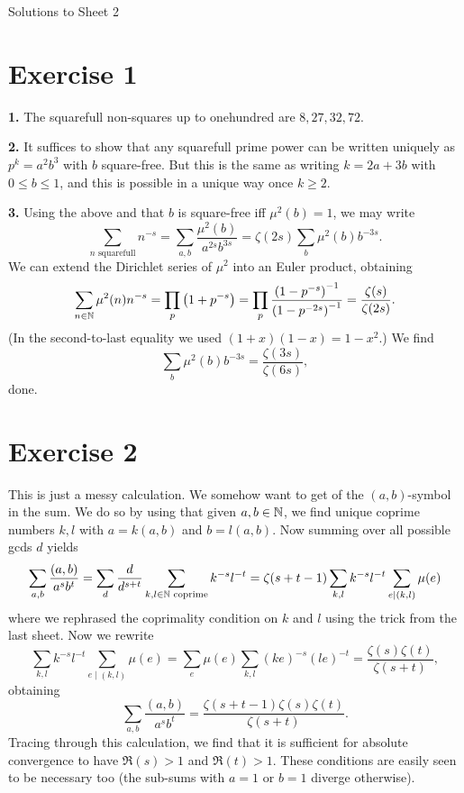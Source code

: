 \documentclass[a4paper,11pt]{article}
\begin{document}
\begin{center}
    \huge{Solutions to Sheet 2}
\end{center}

\section*{Exercise 1}
\textbf{1.} The squarefull non-squares up to onehundred are $8,27,32,72$.

\textbf{2.} It suffices to show that any squarefull prime power can be written uniquely as
$p^k = a^2 b^3$ with $b$ square-free. But this is the same as writing $k =
2a+3b$ with $0 \leq b \leq 1$, and this is possible in a unique way once $k \geq 2$. 

\textbf{3.} Using the above and that $b$ is square-free iff $\mu^2(b) = 1$, we may write
\[
    \sum_{n \text{ squarefull}} n^{-s} = \sum_{a,b} \frac{\mu^2(b)}{a^{2s} b^{3s}} = \zeta(2s) \sum_{b} \mu^2(b) b^{-3s}.
\]
We can extend the Dirichlet series of $\mu^2$ into an Euler product, obtaining
\[
    \sum_{n \in \mathbb{N}} \mu^2(n)n^{-s} = \prod_p \left(1 + p^{-s} \right) = \prod_p
    \frac {\left(1 - p^{-s}\right)^{-1}} {\left(1 - p^{-2s}\right)^{-1}} =
    \frac {\zeta(s)}{\zeta(2s)}.
\]
(In the second-to-last equality we used $(1+x)(1-x) = 1-x^2$.)
We find 
\[
    \sum_{b} \mu^2(b) b^{-3s} = \frac{\zeta(3s) }{\zeta(6s)},
\]
done.

\section*{Exercise 2}
This is just a messy calculation. 
We somehow want to get of the $(a,b)$-symbol in the sum. We do so by using that
given $a,b \in \mathbb{N}$, we find unique coprime numbers $k, l$ with $a = k (a,b)$ and 
$b = l (a,b)$. Now summing over all possible gcds $d$ yields
\[
    \sum_{a,b} \frac{(a,b)}{a^s b^t} = \sum_{d} \frac d{d^{s+t}} \sum_{k,l \in \mathbb{N}
    \text{ coprime}} k^{-s}l^{-t} = \zeta(s+t-1)\sum_{k,l} k^{-s}l^{-t} \sum_{e \mid (k,l)} \mu(e)
\]
where we rephrased the coprimality condition on $k$ and $l$ using the trick
from the last sheet.
Now we rewrite
\[
    \sum_{k,l} k^{-s}l^{-t} \sum_{e \mid (k,l)} \mu(e) = \sum_e \mu(e)
    \sum_{k,l} (ke)^{-s} (le)^{-t} = \frac{\zeta(s)\zeta(t)}{\zeta(s+t)},
\]
obtaining
\[
    \sum_{a,b} \frac{(a,b)}{a^s b^t} = \frac {\zeta(s+t-1) \zeta(s) \zeta(t)}{\zeta(s+t)}.
\]
Tracing through this calculation, we find that it is sufficient for absolute convergence to have
$\Re(s)>1$ and $\Re(t) > 1$. These conditions are easily seen to be necessary too (the sub-sums with 
$a=1$ or $b=1$ diverge otherwise).
\end{document}
